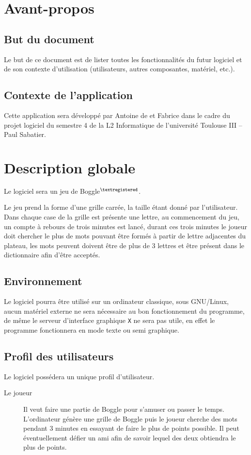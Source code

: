 \documentclass[12pt,a4paper,openany]{article}
\begin{document}
	\setcounter{tocdepth}{2}
	\setcounter{secnumdepth}{3}
	\maketitle
	\tableofcontents
	\newpage
	\section{Avant-propos}
		\subsection{But du document}
	Le but de ce document est de lister toutes les fonctionnalités du futur logiciel et de son contexte d’utilisation (utilisateurs, autres composantes,
	matériel,  etc.).
		\subsection{Contexte de l'application}
		Cette application sera développé par Antoine de  et Fabrice  dans le cadre du projet logiciel du 
		semestre 4 de la L2 Informatique de l'université Toulouse III -- Paul Sabatier.
	
	\section{Description globale} 
	Le logiciel sera un jeu de Boggle$^{\tiny\textregistered}$.

	Le jeu prend la forme d'une grille carrée, la taille étant donné par l'utilisateur. Dans chaque case de la grille est présente une lettre, au
	commencement du jeu, un compte à rebours de trois minutes est lancé, durant ces trois minutes le joueur doit chercher le plus de mots pouvant être
	formés à partir de lettre adjacentes du plateau, les mots peuvent doivent être de plus de 3 lettres et être présent dans le dictionnaire afin d'être
	acceptés.
	\subsection{Environnement}
		Le logiciel pourra être utilisé sur un ordinateur classique, sous GNU/Linux, aucun matériel externe ne sera nécessaire au bon fonctionnement du
		programme, de même le serveur d'interface graphique \texttt{X} ne sera pas utile, en effet le programme fonctionnera en mode texte ou semi graphique.
	\subsection{Profil des utilisateurs}
		Le logiciel possédera un unique profil d'utilisateur.
		\begin{description}
			\item[Le joueur] Il veut faire une partie de Boggle pour s'amuser ou passer le temps. L'ordinateur génère une grille de Boggle puis le
				joueur cherche des mots pendant 3 minutes en essayant de faire le plus de points possible. Il peut éventuellement défier un ami afin de
				savoir lequel des deux obtiendra le plus de points.
		\end{description}
\end{document}
